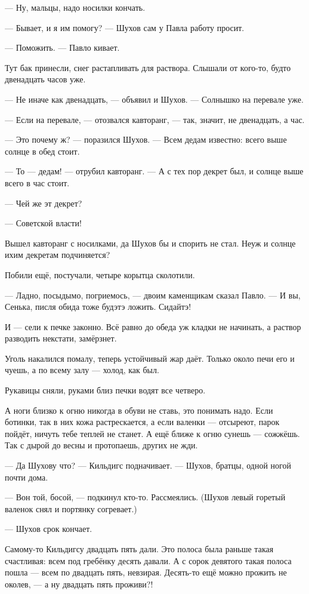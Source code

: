 --- Ну, мальцы, надо носилки кончать.

--- Бывает, и я им помогу? --- Шухов сам у Павла работу просит.

--- Поможить. --- Павло кивает.

Тут бак принесли, снег растапливать для раствора. Слышали от кого-то, будто двенадцать часов уже.

--- Не иначе как двенадцать, --- объявил и Шухов. --- Солнышко на перевале уже.

--- Если на перевале, --- отозвался кавторанг, --- так, значит, не двенадцать, а час.

--- Это почему ж? --- поразился Шухов. --- Всем дедам известно: всего выше солнце в обед стоит.

--- То --- дедам! --- отрубил кавторанг. --- А с тех пор декрет был, и солнце выше всего в час стоит.

--- Чей же эт декрет?

--- Советской власти!

Вышел кавторанг с носилками, да Шухов бы и спорить не стал. Неуж и солнце ихим декретам подчиняется?

Побили ещё, постучали, четыре корытца сколотили.

--- Ладно, посыдымо, погриемось, --- двоим каменщикам сказал Павло. --- И вы, Сенька, писля обида тоже будэтэ ложить. Сидайтэ!

И --- сели к печке законно. Всё равно до обеда уж кладки не начинать, а раствор разводить некстати, замёрзнет.

Уголь накалился помалу, теперь устойчивый жар даёт. Только около печи его и чуешь, а по всему залу --- холод, как был.

Рукавицы сняли, руками близ печки водят все четверо.

А ноги близко к огню никогда в обуви не ставь, это понимать надо. Если ботинки, так в них кожа растрескается, а если валенки --- отсыреют, парок пойдёт, ничуть тебе теплей не станет. А ещё ближе к огню сунешь --- сожжёшь. Так с дырой до весны и протопаешь, других не жди.

--- Да Шухову что? --- Кильдигс подначивает. --- Шухов, братцы, одной ногой почти дома.

--- Вон той, босой, --- подкинул кто-то. Рассмеялись. (Шухов левый горетый валенок снял и портянку согревает.)

--- Шухов срок кончает.

Самому-то Кильдигсу двадцать пять дали. Это полоса была раньше такая счастливая: всем под гребёнку десять давали. А с сорок девятого такая полоса пошла --- всем по двадцать пять, невзирая. Десять-то ещё можно прожить не околев, --- а ну двадцать пять проживи?!

